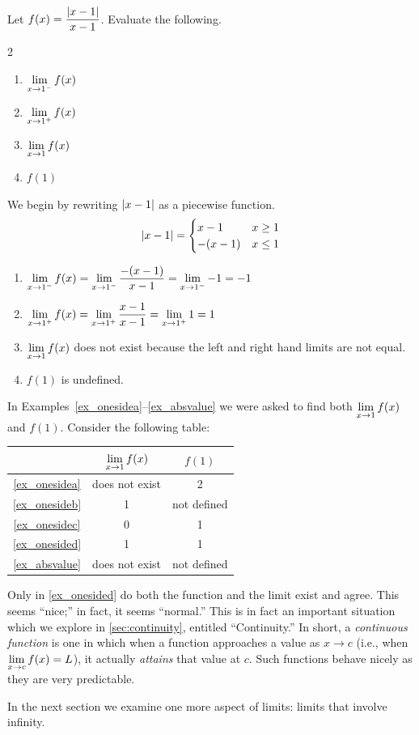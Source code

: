 \begin{example}\label{ex_absvalue}%
Let $f(x) =\dfrac{\left\lvert x-1 \right\rvert}{x-1}$. Evaluate the following.
\begin{multicols}{2}
	\begin{enumerate}
		\item	$\displaystyle \lim_{x\to 1^-} f(x)$
		\item	$\displaystyle \lim_{x\to 1^+} f(x)$
		\item	$\displaystyle \lim_{x\to 1} f(x)$
		\item	$f(1)$
	\end{enumerate}
\end{multicols}
\solution
We begin by rewriting $\left\lvert x-1 \right\rvert$ as a piecewise function.
\[\left\lvert x-1 \right\rvert=\begin{cases}x-1 & x\geq 1 \\ -(x-1) & x\leq 1\end{cases}\]
\begin{enumerate}
\item	$\displaystyle \lim_{x\to 1^-} f(x)=\lim_{x\to 1^-}\frac{-(x-1)}{x-1}=\lim_{x\to 1^-}-1=-1$
\item	$\displaystyle \lim_{x\to 1^+} f(x)=\lim_{x\to 1^+}\frac{x-1}{x-1}=\lim_{x\to 1^+}1=1$
\item 	$\displaystyle \lim_{x\to 1} f(x)$ does not exist because the left and right hand limits are not equal.
\item $f(1)$ is undefined.
\end{enumerate}
\end{example}

In Examples~\ref{ex_onesidea}--\ref{ex_absvalue} we were asked to find both $\displaystyle \lim_{x\to 1}f(x)$ and $f(1)$. Consider the following table:
\begin{center}
\begin{tabular}{ccc}
 & $\displaystyle \lim_{x\to 1}f(x)$ & $f(1)$ \\ \midrule
\autoref{ex_onesidea} & does not exist & 2 \\
\autoref{ex_onesideb} & 1 & not defined \\
\autoref{ex_onesidec} & 0 & 1 \\
\autoref{ex_onesided} & 1 & 1 \\
\autoref{ex_absvalue} & does not exist & not defined
\end{tabular}
\end{center}

Only in \autoref{ex_onesided} do both the function and the limit exist and agree. This seems ``nice;'' in fact, it seems ``normal.'' This is in fact an important situation which we explore in \autoref{sec:continuity}, entitled ``Continuity.'' In short, a \emph{continuous function} is one in which when a function approaches a value as $x\rightarrow c$ (i.e., when $\displaystyle \lim_{x\to c} f(x) = L$), it actually \emph{attains} that value at $c$. Such functions behave nicely as they are very predictable.

In the next section we examine one more aspect of limits: limits that involve infinity.

